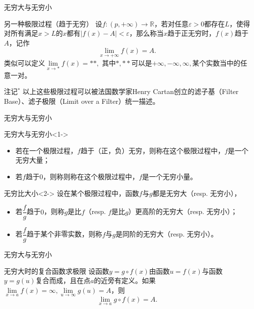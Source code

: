 \begin{frame}{无穷大与无穷小}

\begin{block}{另一种极限过程（趋于无穷）}
设$f:(p,+\infty) \to \mathbb{R}$，若对任意$\varepsilon > 0$都存在$L$，使得对所有满足$x > L$的$x$都有$|f(x)-A| < \varepsilon$，那么称当$x$趋于正无穷时，$f(x)$趋于$A$，记作
\[\lim\limits_{x\to+\infty}f(x) = A.\]
类似可以定义$\lim\limits_{x\to * }f(x) = **,$ 其中$*,**$可以是$+\infty,-\infty,\infty,$某个实数当中的任意一对。
\end{block}

\pause

\begin{block}{注记$^*$}
{\color{zkblue!50}
以上这些极限过程可以被法国数学家Henry Cartan创立的滤子基（Filter Base）、滤子极限（Limit over a Filter）统一描述。
}
\end{block}

\end{frame}


\begin{frame}{无穷大与无穷小}

\begin{block}{无穷大与无穷小}<1->
\begin{itemize}
\item 若在一个极限过程，$f$趋于（正，负）无穷，则称在这个极限过程中，$f$是一个无穷大量；
\item 若$f$趋于$0$，则称则称在这个极限过程中，$f$是一个无穷小量。
\end{itemize}
\end{block}

\begin{block}{无穷比大小}<2->
设在某个极限过程中，函数$f$与$g$都是无穷大（resp. 无穷小），
\begin{itemize}
\item 若$\dfrac{f}{g}$趋于$0$，则称$g$是比$f$（resp. $f$是比$g$）更高阶的无穷大（resp. 无穷小）；
\item 若$\dfrac{f}{g}$趋于某个非零实数，则称$f$与$g$是同阶的无穷大（resp. 无穷小）。
\end{itemize}
\end{block}

\end{frame}


\begin{frame}{无穷大与无穷小}

\begin{block}{无穷大时的复合函数求极限}
设函数$y = g\circ f(x)$由函数$u = f(x)$与函数$y = g(u)$复合而成，且在点$a$的近旁有定义。如果$\lim\limits_{x\to a}f(x) = \infty, \lim\limits_{u\to \infty} g(u) = A$，则
\[\lim\limits_{x\to a} g\circ f(x) = A.\]
\end{block}

\end{frame}


